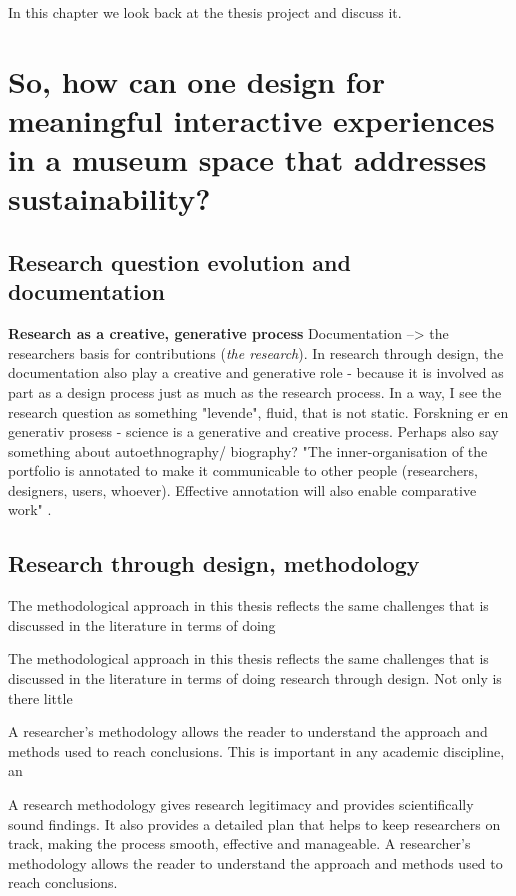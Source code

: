 In this chapter we look back at the thesis project and discuss it.

\section{So, how can one design for meaningful interactive experiences in a museum space that addresses sustainability?}



\subsection{Research question evolution and documentation}

\textbf{Research as a creative, generative process}
Documentation --> the researchers basis for contributions (\emph{the research}). In research through design, the documentation also play a creative and generative role - because it is involved as part as a design process just as much as the research process.
In a way, I see the research question as something "levende", fluid, that is not static. 
Forskning er en generativ prosess - science is a generative and creative process.
Perhaps also say something about autoethnography/ biography?
"The inner-organisation of the portfolio is annotated to make it communicable to other people (researchers, designers, users, whoever). Effective annotation will also enable comparative work" \autocite[p. 72]{bowers_annotated_2012}. 



\subsection{Research through design, methodology}

The methodological approach in this thesis reflects the same challenges that is discussed in the literature in terms of doing 

The methodological approach in this thesis reflects the same challenges that is discussed in the literature in terms of doing research through design. Not only is there little 

A researcher's methodology allows the reader to understand the approach and methods used to reach conclusions. This is important in any academic discipline, an

A research methodology gives research legitimacy and provides scientifically sound findings. It also provides a detailed plan that helps to keep researchers on track, making the process smooth, effective and manageable. A researcher's methodology allows the reader to understand the approach and methods used to reach conclusions.

